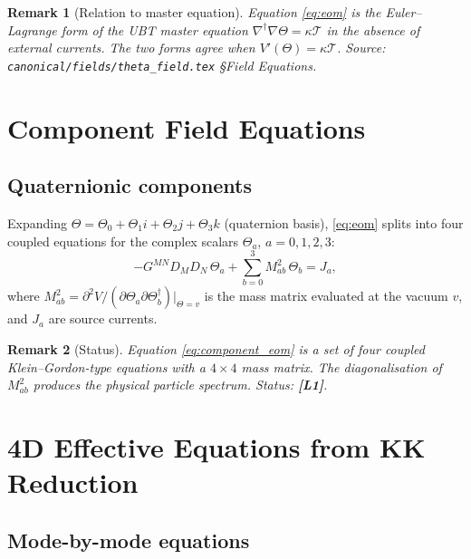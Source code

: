 \documentclass[11pt,a4paper]{article}
\newtheorem{remark}{Remark}
\begin{document}
\begin{remark}[Relation to master equation]
  Equation \eqref{eq:eom} is the Euler--Lagrange form of the UBT master
  equation $\nabla^\dagger\nabla\Theta = \kappa\mathcal{T}$ in the absence
  of external currents.  The two forms agree when $V'(\Theta) = \kappa\mathcal{T}$.
  Source: \texttt{canonical/fields/theta\_field.tex} §Field Equations.
\end{remark}

\section{Component Field Equations}
\label{sec:components}

\subsection{Quaternionic components}

Expanding $\Theta = \Theta_0 + \Theta_1 i + \Theta_2 j + \Theta_3 k$
(quaternion basis), \eqref{eq:eom} splits into four coupled equations
for the complex scalars $\Theta_a$, $a = 0,1,2,3$:
\begin{equation}
\label{eq:component_eom}
  -G^{MN}D_M D_N\,\Theta_a + \sum_{b=0}^{3} M_{ab}^2\,\Theta_b
  = J_a,
\end{equation}
where $M_{ab}^2 = \partial^2 V/(\partial\Theta_a\partial\Theta_b^\dagger)|_{\Theta=v}$
is the mass matrix evaluated at the vacuum $v$, and $J_a$ are source currents.

\begin{remark}[Status]
  Equation \eqref{eq:component_eom} is a set of four coupled
  Klein--Gordon-type equations with a $4\times 4$ mass matrix.  The
  diagonalisation of $M_{ab}^2$ produces the physical particle spectrum.
  Status: \textbf{[L1]}.
\end{remark}

\section{4D Effective Equations from KK Reduction}
\label{sec:kk_eff}

\subsection{Mode-by-mode equations}
\end{document}
